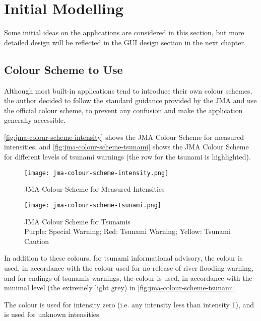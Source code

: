 \section{Initial Modelling}
Some initial ideas on the applications are considered in this section, but more detailed design will be reflected in the GUI design section in the next chapter.

\subsection{Colour Scheme to Use}
Although most built-in applications tend to introduce their own colour schemes, the author decided to follow the standard guidance provided by the JMA \autocite{jma-colour-guidance} and use the official colour scheme, to prevent any confusion and make the application generally accessible.

\autoref{fig:jma-colour-scheme-intensity} shows the JMA Colour Scheme for measured intensities, and \autoref{fig:jma-colour-scheme-tsunami} shows the JMA Colour Scheme for different levels of tsunami warnings (the row for the tsunami is highlighted).

\begin{figure}[htp]
    \centering

    \texttt{[image: jma-colour-scheme-intensity.png]}
    \caption{JMA Colour Scheme for Measured Intensities}
    \label{fig:jma-colour-scheme-intensity}
\end{figure}

\begin{figure}[htp]
    \centering

    \texttt{[image: jma-colour-scheme-tsunami.png]}
    \caption[JMA Colour Scheme for Tsunamis]{JMA Colour Scheme for Tsunamis\\
        Purple: Special Warning; Red: Tsunami Warning; Yellow: Tsunami Caution}
    \label{fig:jma-colour-scheme-tsunami}
\end{figure}

In addition to these colours, for tsunami informational advisory, the colour  is used, in accordance with the colour used for no release of river flooding warning, and for endings of tsunamis warnings, the colour  is used, in accordance with the minimal level (the extremely light grey) in \autoref{fig:jma-colour-scheme-tsunami}.

The colour  is used for intensity zero (i.e. any intensity less than intensity 1), and  is used for unknown intensities.

